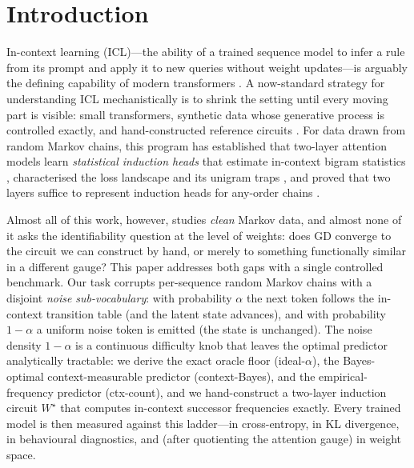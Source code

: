 \documentclass{article} %
\newcommand{\ctxcount}{\textsf{ctx-count}}
\newcommand{\ctxbayes}{\textsf{context-Bayes}}
\newcommand{\idealalpha}{\textsf{ideal-$\alpha$}}
\newcommand{\Wstar}{W^{\star}}
\begin{document}
\section{Introduction}
\label{sec:intro}

In-context learning (ICL)---the ability of a trained sequence model to infer a rule
from its prompt and apply it to new queries without weight updates---is arguably the
defining capability of modern transformers \citep{brown2020language}. A now-standard
strategy for understanding ICL mechanistically is to shrink the setting until every
moving part is visible: small transformers, synthetic data whose generative process is
controlled exactly, and hand-constructed reference circuits
\citep{elhage2021mathematical,olsson2022context,bietti2023birth,reddy2024mechanistic}.
For data drawn from random Markov chains, this program has established that two-layer
attention models learn \emph{statistical induction heads} that estimate in-context
bigram statistics \citep{edelman2024evolution,akyurek2024incontext}, characterised the
loss landscape and its unigram traps
\citep{makkuva2024attention,makkuva2024local,varre2025learning}, and proved that
two layers suffice to represent induction heads for any-order chains
\citep{rajaraman2024transformers,ekbote2025what}.

Almost all of this work, however, studies \emph{clean} Markov data, and almost none of
it asks the identifiability question at the level of weights: does GD converge to the
circuit we can construct by hand, or merely to something functionally similar in a
different gauge? This paper addresses both gaps with a single controlled benchmark.
Our task corrupts per-sequence random Markov chains with a disjoint \emph{noise
sub-vocabulary}: with probability $\alpha$ the next token follows the in-context
transition table (and the latent state advances), and with probability $1-\alpha$ a
uniform noise token is emitted (the state is unchanged). The noise density $1-\alpha$
is a continuous difficulty knob that leaves the optimal predictor analytically
tractable: we derive the exact oracle floor (\idealalpha{}), the Bayes-optimal
context-measurable predictor (\ctxbayes{}), and the empirical-frequency predictor
(\ctxcount{}), and we hand-construct a two-layer induction circuit $\Wstar$ that
computes in-context successor frequencies exactly. Every trained model is then
measured against this ladder---in cross-entropy, in KL divergence, in behavioural
diagnostics, and (after quotienting the attention gauge) in weight space.
\end{document}
